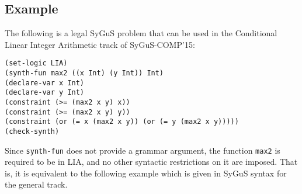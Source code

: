 \documentclass{llncs}
\begin{document}

\subsection*{Example}
The following is a legal SyGuS problem that can be used in the  Conditional Linear Integer Arithmetic track of SyGuS-COMP'15:
\begin{verbatim}
(set-logic LIA)
(synth-fun max2 ((x Int) (y Int)) Int)
(declare-var x Int)
(declare-var y Int)
(constraint (>= (max2 x y) x))
(constraint (>= (max2 x y) y))
(constraint (or (= x (max2 x y)) (or (= y (max2 x y)))))
(check-synth)
\end{verbatim}
Since \texttt{synth-fun} does not provide a grammar argument, the function \texttt{max2} is required to be in LIA, and no other syntactic restrictions on it are imposed. That is, it is equivalent to the following example which is given in SyGuS syntax for the general track.
\end{document}
